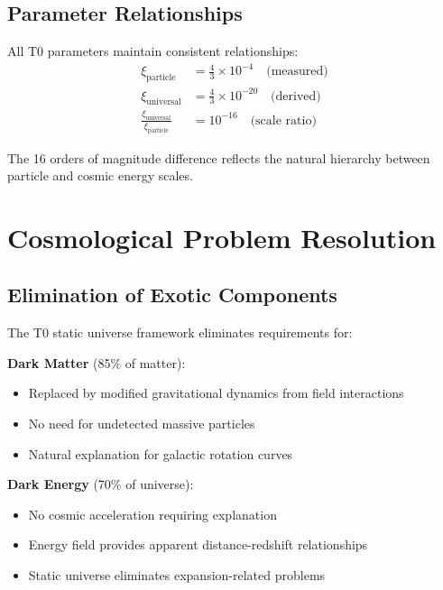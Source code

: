 \documentclass[12pt,a4paper]{article}
\begin{document}
	\subsection{Parameter Relationships}
	\label{subsec:parameter_relations}
	
	All T0 parameters maintain consistent relationships:
	\begin{align}
		\xi_{\text{particle}} &= \frac{4}{3} \times 10^{-4} \quad \text{(measured)} \\
		\xi_{\text{universal}} &= \frac{4}{3} \times 10^{-20} \quad \text{(derived)} \\
		\frac{\xi_{\text{universal}}}{\xi_{\text{particle}}} &= 10^{-16} \quad \text{(scale ratio)}
	\end{align}
	
	The 16 orders of magnitude difference reflects the natural hierarchy between particle and cosmic energy scales.
	
	\section{Cosmological Problem Resolution}
	\label{sec:problem_resolution}
	
	\subsection{Elimination of Exotic Components}
	\label{subsec:exotic_elimination}
	
	The T0 static universe framework eliminates requirements for:
	
	\textbf{Dark Matter} (85\% of matter):
	\begin{itemize}
		\item Replaced by modified gravitational dynamics from field interactions
		\item No need for undetected massive particles
		\item Natural explanation for galactic rotation curves
	\end{itemize}
	
	\textbf{Dark Energy} (70\% of universe):
	\begin{itemize}
		\item No cosmic acceleration requiring explanation
		\item Energy field provides apparent distance-redshift relationships
		\item Static universe eliminates expansion-related problems
	\end{itemize}
	
\end{document}
